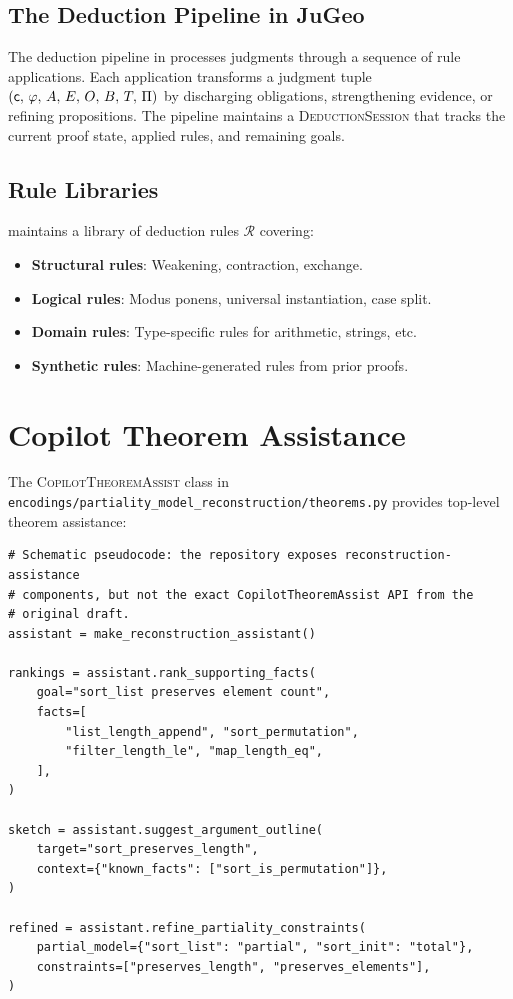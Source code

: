 \documentclass[11pt]{article}
\newcommand{\ThAssist}{\textsc{CopilotTheoremAssist}}
\newcommand{\DedSess}{\textsc{DeductionSession}}
\newcommand{\rulelib}{\mathcal{R}}
\begin{document}
\subsection{The Deduction Pipeline in JuGeo}

The deduction pipeline in \JuGeo{} processes judgments through a sequence of
rule applications.  Each application transforms a judgment tuple
$(\mathsf{c},\,\varphi,\,A,\,E,\,O,\,B,\,T,\,\Pi)$ by discharging obligations,
strengthening evidence, or refining propositions.  The pipeline maintains a
\DedSess{} that tracks the current proof state, applied rules, and remaining
goals.

\subsection{Rule Libraries}

\JuGeo{} maintains a library of deduction rules $\rulelib$ covering:
\begin{itemize}[leftmargin=2em]
  \item \textbf{Structural rules}: Weakening, contraction, exchange.
  \item \textbf{Logical rules}: Modus ponens, universal instantiation, case split.
  \item \textbf{Domain rules}: Type-specific rules for arithmetic, strings, etc.
  \item \textbf{Synthetic rules}: Machine-generated rules from prior proofs.
\end{itemize}

\section{Copilot Theorem Assistance}\label{sec:theorem-assist}

The \ThAssist{} class in
\texttt{encodings/partiality\_model\_reconstruction/theorems.py} provides
top-level theorem assistance:

\begin{lstlisting}[style=jugeo-python]
# Schematic pseudocode: the repository exposes reconstruction-assistance
# components, but not the exact CopilotTheoremAssist API from the
# original draft.
assistant = make_reconstruction_assistant()

rankings = assistant.rank_supporting_facts(
    goal="sort_list preserves element count",
    facts=[
        "list_length_append", "sort_permutation",
        "filter_length_le", "map_length_eq",
    ],
)

sketch = assistant.suggest_argument_outline(
    target="sort_preserves_length",
    context={"known_facts": ["sort_is_permutation"]},
)

refined = assistant.refine_partiality_constraints(
    partial_model={"sort_list": "partial", "sort_init": "total"},
    constraints=["preserves_length", "preserves_elements"],
)
\end{lstlisting}
\end{document}
